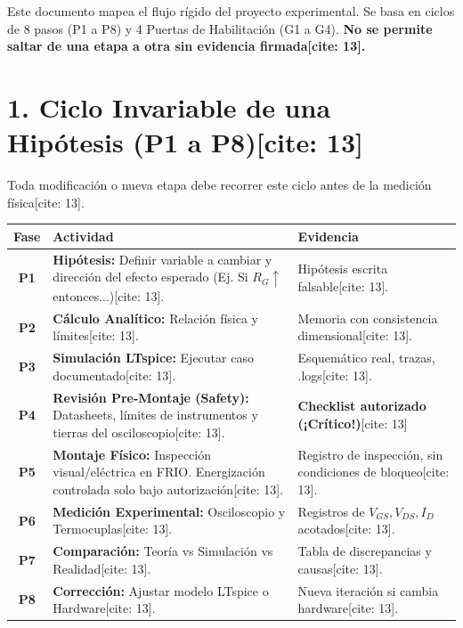 \documentclass[11pt, a4paper]{article}
\begin{document}
\begin{tcolorbox}[colback=ucbblue!5, colframe=ucbblue, title=\textbf{Arquitectura Funcional del Proyecto: Protocolo Incremental EC3[cite: 13]}]
    Este documento mapea el flujo rígido del proyecto experimental. Se basa en ciclos de 8 pasos (P1 a P8) y 4 Puertas de Habilitación (G1 a G4). \textbf{No se permite saltar de una etapa a otra sin evidencia firmada[cite: 13].}
\end{tcolorbox}

\section*{1. Ciclo Invariable de una Hipótesis (P1 a P8)[cite: 13]}
Toda modificación o nueva etapa debe recorrer este ciclo antes de la medición física[cite: 13].

\par\vspace{0.2cm}\noindent
\renewcommand{\arraystretch}{1.4}
\begin{tabularx}{\linewidth}{|c|>{\raggedright\arraybackslash}X|>{\raggedright\arraybackslash}X|}
\hline
\rowcolor{gray!20}
\textbf{Fase} & \textbf{Actividad} & \textbf{Evidencia} \\ \hline
\textbf{P1} & \textbf{Hipótesis:} Definir variable a cambiar y dirección del efecto esperado (Ej. Si $R_G \uparrow$ entonces...)[cite: 13]. & Hipótesis escrita falsable[cite: 13]. \\ \hline
\textbf{P2} & \textbf{Cálculo Analítico:} Relación física y límites[cite: 13]. & Memoria con consistencia dimensional[cite: 13]. \\ \hline
\textbf{P3} & \textbf{Simulación LTspice:} Ejecutar caso documentado[cite: 13]. & Esquemático real, trazas, .logs[cite: 13]. \\ \hline
\textbf{P4} & \textbf{Revisión Pre-Montaje (Safety):} Datasheets, límites de instrumentos y tierras del osciloscopio[cite: 13]. & \textbf{Checklist autorizado (¡Crítico!)}[cite: 13] \\ \hline
\textbf{P5} & \textbf{Montaje Físico:} Inspección visual/eléctrica en FRIO. Energización controlada solo bajo autorización[cite: 13]. & Registro de inspección, sin condiciones de bloqueo[cite: 13]. \\ \hline
\textbf{P6} & \textbf{Medición Experimental:} Osciloscopio y Termocuplas[cite: 13]. & Registros de $V_{GS}, V_{DS}, I_D$ acotados[cite: 13]. \\ \hline
\textbf{P7} & \textbf{Comparación:} Teoría vs Simulación vs Realidad[cite: 13]. & Tabla de discrepancias y causas[cite: 13]. \\ \hline
\textbf{P8} & \textbf{Corrección:} Ajustar modelo LTspice o Hardware[cite: 13]. & Nueva iteración si cambia hardware[cite: 13]. \\ \hline
\end{tabularx}
\end{document}
